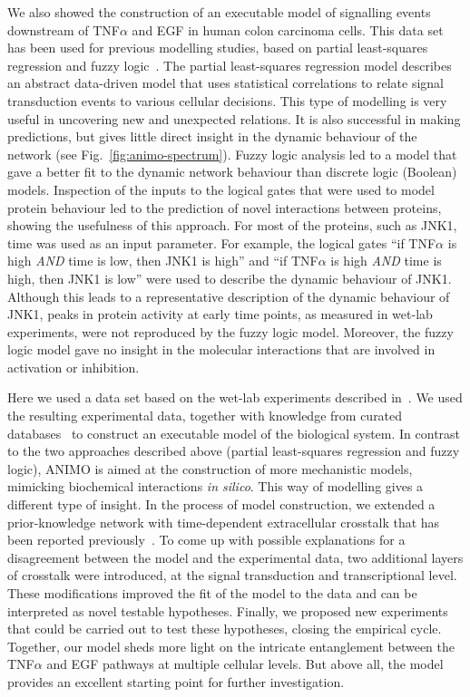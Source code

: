 \documentclass{bmcart}
\begin{document}
We also showed the construction of an executable model
of signalling events downstream of
TNF$\alpha$ and EGF in human colon carcinoma cells. This data set has been used for
previous modelling studies, based on partial least-squares regression and fuzzy
logic~\cite{pathway-leastsquare,pathway-fuzzy}.
The partial least-squares regression model describes an abstract data-driven model
that uses statistical correlations
to relate signal transduction events to various cellular decisions. This type of modelling is
very useful in uncovering new and unexpected relations. It is also successful in making
predictions, but gives little direct insight in the dynamic behaviour of the network (see Fig.~\ref{fig:animo-spectrum}). Fuzzy
logic analysis led to a model that gave a better fit to the dynamic network behaviour than
discrete logic (Boolean) models. Inspection of the inputs to the logical gates that were used
to model protein behaviour led to the prediction of novel interactions between proteins,
showing the usefulness of this approach. For most of the proteins, such as JNK1, time was
used as an input parameter. For example, the logical gates ``if TNF$\alpha$ is high
\emph{AND} time is low, then JNK1 is high'' and ``if TNF$\alpha$ is high \emph{AND} time is
high, then JNK1 is low'' were used to
describe the dynamic behaviour of JNK1. Although this leads to a representative
description of the dynamic behaviour of JNK1, peaks in protein activity at early time points,
as measured in wet-lab experiments, were
not reproduced by the fuzzy logic model. Moreover, the fuzzy logic model gave no insight in the molecular interactions
that are involved in activation or inhibition.

Here we used a data set based on the wet-lab experiments described in~\cite{pathway-compendium}. We used the
resulting experimental data, together with knowledge from curated databases~\cite{kegg,phosphosite}
to construct an executable model of the biological system.
In contrast to the two approaches described above (partial least-squares regression and fuzzy logic), ANIMO is aimed at the construction of
more mechanistic models, mimicking biochemical interactions \emph{in silico}. This way of modelling
gives a different type of insight. In the process of model construction, we extended a
prior-knowledge network with time-dependent extracellular crosstalk that has been reported
previously~\cite{pathway-autocrine}. To come up with possible explanations for a disagreement
between the model and the experimental data, two additional layers of
crosstalk were introduced, at the signal transduction and transcriptional level. These modifications
improved the fit of the model to the data and can be interpreted as novel testable hypotheses.
Finally, we proposed new experiments that could be carried out to test these hypotheses, closing the empirical cycle.
Together, our model sheds more light on the intricate
entanglement between the TNF$\alpha$ and EGF pathways at multiple cellular levels.
But above all,  the model provides an excellent starting point for further investigation.
\end{document}
